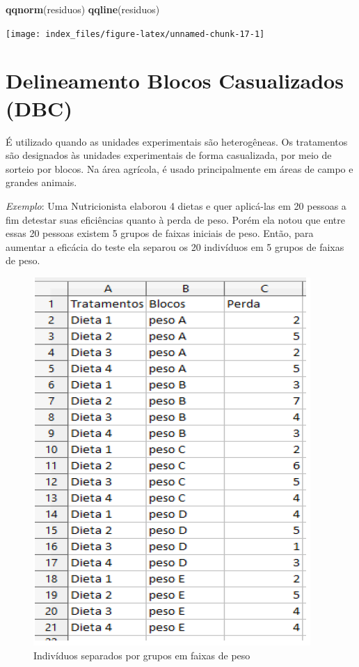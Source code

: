 \documentclass[12pt,brazil,oneside]{book}
\newenvironment{Shaded}{\begin{snugshade}}{\end{snugshade}}
\newcommand{\KeywordTok}[1]{\textcolor[rgb]{0.13,0.29,0.53}{\textbf{#1}}}
\newcommand{\NormalTok}[1]{#1}
\begin{document}
\begin{Shaded}
\begin{Highlighting}[]
\KeywordTok{qqnorm}\NormalTok{(residuos)}
\KeywordTok{qqline}\NormalTok{(residuos)}
\end{Highlighting}
\end{Shaded}

\begin{center}\texttt{[image: index\_files/figure-latex/unnamed-chunk-17-1]} \end{center}

\hypertarget{delineamento-blocos-casualizados-dbc}{%
\section{Delineamento Blocos Casualizados (DBC)}\label{delineamento-blocos-casualizados-dbc}}

É utilizado quando as unidades experimentais são heterogêneas. Os tratamentos são designados às unidades experimentais de forma casualizada, por meio de sorteio por blocos. Na área agrícola, é usado principalmente em áreas de campo e grandes animais.

\emph{Exemplo}: Uma Nutricionista elaborou 4 dietas e quer aplicá-las em 20 pessoas a fim detestar suas eficiências quanto à perda de peso. Porém ela notou que entre essas 20 pessoas existem 5 grupos de faixas iniciais de peso. Então, para aumentar a eficácia do teste ela separou os 20 indivíduos em 5 grupos de faixas de peso.

\begin{figure}[H]

{\centering \includegraphics[width=0.8\linewidth]{delimexp1} 

}

\caption{Indivíduos separados por grupos em faixas de peso}\label{fig:unnamed-chunk-18}
\end{figure}
\end{document}
